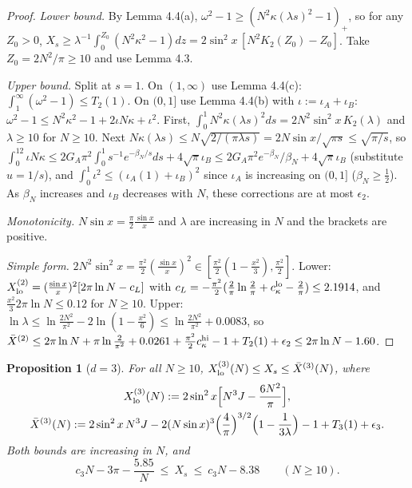 \documentclass[11pt,a4paper]{article}
\newtheorem{proposition}[theorem]{Proposition}
\theoremstyle{definition}
\theoremstyle{remark}
\begin{document}
\begin{proof}
\emph{Lower bound.} By Lemma 4.4(a), $\omega^2-1\ge(N^2\kappa(\lambda s)^2-1)_+$, so for any $Z_0>0$, $X_s\ge\lambda^{-1}\int_0^{Z_0}(N^2\kappa^2-1)dz=2\sin^2x\,[N^2K_2(Z_0)-Z_0]$. Take $Z_0=2N^2/\pi\ge10$ and use Lemma 4.3.

\emph{Upper bound.} Split at $s=1$. On $(1,\infty)$ use Lemma 4.4(c): $\int_1^\infty(\omega^2-1)\le T_2(1)$. On $(0,1]$ use Lemma 4.4(b) with $\iota:=\iota_A+\iota_B$: $\omega^2-1\le N^2\kappa^2-1+2\iota N\kappa+\iota^2$. First, $\int_0^1N^2\kappa(\lambda s)^2ds=2N^2\sin^2x\,K_2(\lambda)$ and $\lambda\ge10$ for $N\ge10$. Next $N\kappa(\lambda s)\le N\sqrt{2/(\pi\lambda s)}=2N\sin x/\sqrt{\pi s}\le\sqrt{\pi/s}$, so $\int_0^12\iota N\kappa\le2G_A\pi^2\int_0^1s^{-1}e^{-\beta_N/s}ds+4\sqrt\pi\iota_B\le2G_A\pi^2e^{-\beta_N}/\beta_N+4\sqrt\pi\iota_B$ (substitute $u=1/s$), and $\int_0^1\iota^2\le(\iota_A(1)+\iota_B)^2$ since $\iota_A$ is increasing on $(0,1]$ ($\beta_N\ge\frac12$). As $\beta_N$ increases and $\iota_B$ decreases with $N$, these corrections are at most $\epsilon_2$.

\emph{Monotonicity.} $N\sin x=\frac\pi2\frac{\sin x}{x}$ and $\lambda$ are increasing in $N$ and the brackets are positive.

\emph{Simple form.} $2N^2\sin^2x=\frac{\pi^2}2(\frac{\sin x}{x})^2\in[\frac{\pi^2}{2}(1-\frac{x^2}3),\frac{\pi^2}2]$. Lower: $X^{(2)}_{\rm lo}=(\frac{\sin x}{x})^2[2\pi\ln N-c_L]$ with $c_L=-\frac{\pi^2}{2}(\frac2\pi\ln\frac2\pi+c_\kappa^{\rm lo}-\frac2\pi)\le2.1914$, and $\frac{x^2}{3}2\pi\ln N\le0.12$ for $N\ge10$. Upper: $\ln\lambda\le\ln\frac{2N^2}{\pi^2}-2\ln(1-\frac{x^2}6)\le\ln\frac{2N^2}{\pi^2}+0.0083$, so $\bar X^{(2)}\le2\pi\ln N+\pi\ln\frac{2}{\pi^2}+0.0261+\frac{\pi^2}{2}c_\kappa^{\rm hi}-1+T_2(1)+\epsilon_2\le2\pi\ln N-1.60$.
\end{proof}

\begin{proposition}[{$d=3$}]
For all $N\ge10$, $X^{(3)}_{\rm lo}(N)\le X_s\le\bar X^{(3)}(N)$, where
\begin{gather*}
X^{(3)}_{\rm lo}(N):=2\sin^2x\Bigl[N^3J-\frac{6N^2}{\pi}\Bigr], \\
\bar X^{(3)}(N):=2\sin^2x\,N^3J-2(N\sin x)^3\Bigl(\frac4\pi\Bigr)^{3/2}\Bigl(1-\frac{1}{3\lambda}\Bigr)-1+T_3(1)+\epsilon_3 .
\end{gather*}
Both bounds are increasing in $N$, and
\begin{equation*}
c_3N-3\pi-\frac{5.85}{N}\ \le\ X_s\ \le\ c_3N-8.38\qquad(N\ge10).
\end{equation*}
\end{proposition}
\end{document}
